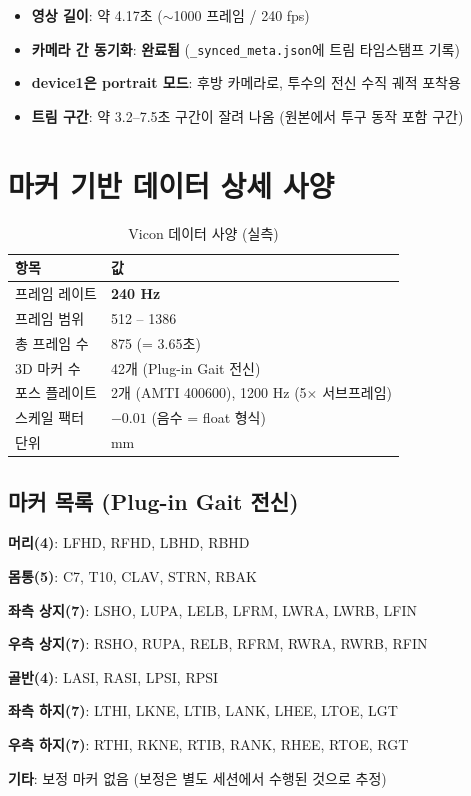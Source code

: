 \documentclass[11pt, a4paper]{report}
\begin{document}
\begin{itemize}[leftmargin=*]
  \item \textbf{영상 길이}: 약 4.17초 ($\sim$1000 프레임 / 240 fps)
  \item \textbf{카메라 간 동기화}: \textbf{완료됨} (\texttt{\_synced\_meta.json}에 트림 타임스탬프 기록)
  \item \textbf{device1은 portrait 모드}: 후방 카메라로, 투수의 전신 수직 궤적 포착용
  \item \textbf{트림 구간}: 약 3.2--7.5초 구간이 잘려 나옴 (원본에서 투구 동작 포함 구간)
\end{itemize}


\section{마커 기반 데이터 상세 사양}

\begin{table}[H]
\centering
\caption{Vicon 데이터 사양 (실측)}
\label{tab:vicon_spec}
\renewcommand{\arraystretch}{1.3}
\begin{tabular}{ll}
\toprule
\textbf{항목} & \textbf{값} \\
\midrule
프레임 레이트 & \textbf{240 Hz} \\
프레임 범위 & 512 -- 1386 \\
총 프레임 수 & 875 (= 3.65초) \\
3D 마커 수 & 42개 (Plug-in Gait 전신) \\
포스 플레이트 & 2개 (AMTI 400600), 1200 Hz (5$\times$ 서브프레임) \\
스케일 팩터 & $-0.01$ (음수 = float 형식) \\
단위 & mm \\
\bottomrule
\end{tabular}
\end{table}

\subsection{마커 목록 (Plug-in Gait 전신)}

\begin{biomechbox}[title={42개 마커 --- 실측}]
\textbf{머리(4)}: LFHD, RFHD, LBHD, RBHD

\textbf{몸통(5)}: C7, T10, CLAV, STRN, RBAK

\textbf{좌측 상지(7)}: LSHO, LUPA, LELB, LFRM, LWRA, LWRB, LFIN

\textbf{우측 상지(7)}: RSHO, RUPA, RELB, RFRM, RWRA, RWRB, RFIN

\textbf{골반(4)}: LASI, RASI, LPSI, RPSI

\textbf{좌측 하지(7)}: LTHI, LKNE, LTIB, LANK, LHEE, LTOE, LGT

\textbf{우측 하지(7)}: RTHI, RKNE, RTIB, RANK, RHEE, RTOE, RGT

\textbf{기타}: 보정 마커 없음 (보정은 별도 세션에서 수행된 것으로 추정)
\end{biomechbox}
\end{document}
